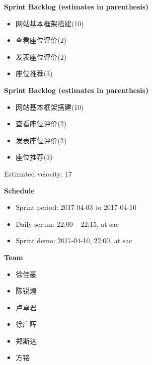 \documentclass[a4paper]{article}
\begin{document}
  \par {\bf Sprint Backlog (estimates in parenthesis)}
  \begin{itemize}
    \item 网站基本框架搭建(10)
    \item 查看座位评价(2)
    \item 发表座位评价(2)
    \item 座位推荐(3)
  \end{itemize}


  \par {\bf Sprint Backlog (estimates in parenthesis)}
  \begin{itemize}
    \item 网站基本框架搭建(10)
    \item 查看座位评价(2)
    \item 发表座位评价(2)
    \item 座位推荐(3)
  \end{itemize}
\indent Estimated velocity: 17

\par {\bf Schedule}
  \begin{itemize}
    \item Sprint period: 2017-04-03 to 2017-04-10
    \item Daily scrum: 22:00 – 22:15, at sac
    \item Sprint demo: 2017-04-10, 22:00, at sac
  \end{itemize}

\par {\bf Team}
  \begin{itemize}
    \item 徐佳豪
    \item 陈锐煌
    \item 卢卓君
    \item 徐广晖
    \item 郑斯达
    \item 方铭
  \end{itemize}

\newpage
\end{document}
